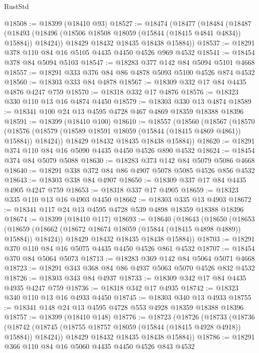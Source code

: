 \begin{lexlean}{RustStd}
\begin{coremodule}
@18508 := @18399 (@18410 @93)
@18527 := @18474
    (@18477
      (@18484
        (@18487
          (@18493 (@18496 (@18506 @18508 @18059 (@15844 (@18415 @4841 @4834)) @15884)) @18424))
        @18429
        @18432
        @18435
        @18438
        @15884))
@18537 := @18291 @378 @110 @84 @16 @5105 @4435 @4450 @4526 @969 @4532
@18541 := @18454 @378 @84 @5094 @5103
@18547 := @18283 @377 @142 @84 @5094 @5101 @4668
@18557 := @18291 @333 @376 @84 @86 @4878 @5093 @5100 @4526 @874 @4532
@18560 := @18303 @333 @84 @4878
@18567 := @18309 @332 @17 @84 @4435 @4876 @4247 @759
@18570 := @18318 @332 @17 @4876
@18576 := @18323 @330 @110 @13 @16 @4874 @4450
@18579 := @18303 @330 @13 @4874
@18589 := @18341 @100 @24 @13 @4595 @4728 @467 @4869 @18359 @18388 @18396
@18591 := @18399 (@18410 @100)
@18610 := @18557
    (@18560
      (@18567
        (@18570
          (@18576 (@18579 (@18589 @18591 @18059 (@15844 (@18415 @4869 @4861)) @15884)) @18424))
        @18429
        @18432
        @18435
        @18438
        @15884))
@18620 := @18291 @374 @110 @84 @16 @5090 @4435 @4450 @4526 @890 @4532
@18624 := @18454 @374 @84 @5079 @5088
@18630 := @18283 @373 @142 @84 @5079 @5086 @4668
@18640 := @18291 @338 @372 @84 @86 @4907 @5078 @5085 @4526 @856 @4532
@18643 := @18303 @338 @84 @4907
@18650 := @18309 @337 @17 @84 @4435 @4905 @4247 @759
@18653 := @18318 @337 @17 @4905
@18659 := @18323 @335 @110 @13 @16 @4903 @4450
@18662 := @18303 @335 @13 @4903
@18672 := @18341 @117 @24 @13 @4595 @4728 @539 @4898 @18359 @18388 @18396
@18674 := @18399 (@18410 @117)
@18693 := @18640
    (@18643
      (@18650
        (@18653
          (@18659 (@18662 (@18672 @18674 @18059 (@15844 (@18415 @4898 @4889)) @15884)) @18424))
        @18429
        @18432
        @18435
        @18438
        @15884))
@18703 := @18291 @370 @110 @84 @16 @5075 @4435 @4450 @4526 @861 @4532
@18707 := @18454 @370 @84 @5064 @5073
@18713 := @18283 @369 @142 @84 @5064 @5071 @4668
@18723 := @18291 @343 @368 @84 @86 @4937 @5063 @5070 @4526 @832 @4532
@18726 := @18303 @343 @84 @4937
@18733 := @18309 @342 @17 @84 @4435 @4935 @4247 @759
@18736 := @18318 @342 @17 @4935
@18742 := @18323 @340 @110 @13 @16 @4933 @4450
@18745 := @18303 @340 @13 @4933
@18755 := @18341 @148 @24 @13 @4595 @4728 @553 @4928 @18359 @18388 @18396
@18757 := @18399 (@18410 @148)
@18776 := @18723
    (@18726
      (@18733
        (@18736
          (@18742 (@18745 (@18755 @18757 @18059 (@15844 (@18415 @4928 @4918)) @15884)) @18424))
        @18429
        @18432
        @18435
        @18438
        @15884))
@18786 := @18291 @366 @110 @84 @16 @5060 @4435 @4450 @4526 @843 @4532

\end{coremodule}
\end{lexlean}
